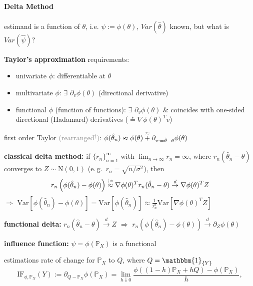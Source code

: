 \documentclass[8pt,twoside]{extarticle}
\begin{document}
\begin{multicols}{2}
\paragraph{Delta Method}  \citep{zepeda2022delta} estimand is a function of $\theta$, i.e. $\psi := \phi(\theta)$, $Var(\hat{\theta})$ known, but what is $Var(\hat{\psi})$?


\noindent \textbf{Taylor's approximation} requirements:
\begin{itemize}[leftmargin=*, itemsep=0em, topsep=0pt, partopsep=0pt,parsep=0pt]
\item univariate $\phi$: differentiable at $\theta$
\item multivariate $\phi$: $\exists$ $\partial_v\phi(\theta)$ (directional derivative)
\item functional $\phi$ (function of functions): $\exists$ $\partial_v\phi(\theta)$ \& coincides with one-sided directional (Hadamard) derivatives ($\overset{*}{=}\nabla \phi(\theta)^Tv$)
\end{itemize}

\noindent first order Taylor \textcolor{gray}{(rearranged$^\dagger$)}: $\phi(\hat{\theta}_n) \overset{\mathbin{\textcolor{gray}{-}}}{\approx} \phi(\theta) \overset{\mathbin{\textcolor{gray}{\approx}}}{+} \partial_{v:=\hat{\theta}-\theta}\phi(\theta)$

\noindent \textbf{classical delta method:} if $\{r_n\}_{n=1}^\infty$ with $\lim_{n\to\infty} r_n=\infty$, where $r_n(\hat{\theta}_n -\theta)$ converges to $Z {\sim} \mathrm{N}(0,1)$ (e.\,g.\  $r_n{=}\sqrt{n/\sigma^2}$), then
$$r_n\left(\phi(\hat{\theta}_n) -\phi(\theta)\right) \overset{\mathbin{\textcolor{gray}{\dagger}}*}{\approx} \nabla \phi(\theta)^Tr_n(\hat{\theta}_n - \theta)    \overset{d}{\to} \nabla \phi(\theta)^TZ$$
$\Rightarrow$ $\mathrm{Var}\left[\phi(\hat{\theta}_n) {-}\phi(\theta)\right] = \mathrm{Var}\left[\phi(\hat{\theta}_n)\right]\approx \frac{1}{r^2_n} \mathrm{Var}\left[\nabla\phi(\theta)^TZ\right]$

\noindent \textbf{functional delta:} $r_n(\hat{\theta}_n {-} \theta) \overset{d}{\to}Z$ $\Rightarrow$ 
$r_n\!\left(\phi(\hat{\theta}_n) {-} \phi(\theta)\right) \overset{d}{\to}\partial_Z\phi(\theta)$

\noindent \textbf{influence function:} $\psi = \phi(\mathbb{P}_X)$ is a functional


\noindent estimations rate of change for $\mathbb{P}_X$ to $Q$, where $Q=\mathbbm{1}_{\{Y\}}$
$$\mathrm{IF}_{\phi, \mathbb{P}_X}(Y) := \partial_{Q-\mathbb{P}_X}\phi(\mathbb{P}_X) =\lim_{h\downarrow 0}\frac{\phi\left((1-h)\mathbb{P}_X + hQ\right)-\phi(\mathbb{P}_X)}{h},$$




\end{multicols}
\end{document}
